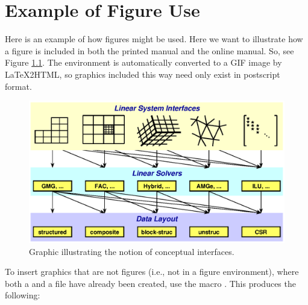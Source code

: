 \chapter{Example of Figure Use}
\label{Example of Figure Use}

Here is an example of how figures might be used.  Here we want to
illustrate how a figure is included in both the printed manual and the
online manual.  So, see Figure \ref{fig-conceptual-interface}.  The
 environment is automatically converted to a GIF image by
LaTeX2HTML, so graphics included this way need only exist in
postscript format.
\begin{figure}
\centering
\includegraphics[width=5in]{concep_iface.eps}
\caption{%
Graphic illustrating the notion of conceptual interfaces.}
\label{fig-conceptual-interface}
\end{figure}

To insert graphics that are not figures (i.e., not in a figure
environment), where both a  and a  file have
already been created, use the macro .  This
produces the following:

\begin{center}
\end{center}
